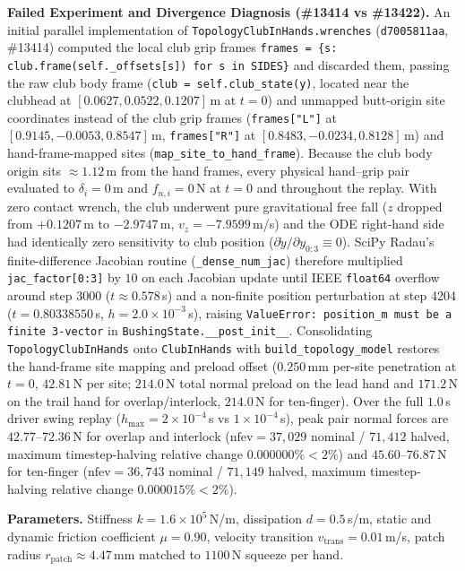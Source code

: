 \documentclass[11pt,a4paper]{article}
\begin{document}
\textbf{Failed Experiment and Divergence Diagnosis (\#13414 vs \#13422).} An initial parallel implementation of
\texttt{TopologyClubInHands.wrenches} (\texttt{d7005811aa}, \#13414) computed the local club grip frames
\texttt{frames = \{s: club.frame(self.\_offsets[s]) for s in SIDES\}} and discarded them, passing the raw club body frame
(\texttt{club = self.club\_state(y)}, located near the clubhead at $[0.0627, 0.0522, 0.1207]$\,m at $t=0$) and unmapped butt-origin site
coordinates instead of the club grip frames (\texttt{frames["L"]} at $[0.9145, -0.0053, 0.8547]$\,m, \texttt{frames["R"]} at
$[0.8483, -0.0234, 0.8128]$\,m) and hand-frame-mapped sites (\texttt{map\_site\_to\_hand\_frame}). Because the club body origin sits
$\approx 1.12$\,m from the hand frames, every physical hand--grip pair evaluated to $\delta_i = 0$\,m and $f_{n,i} = 0$\,N at $t=0$ and
throughout the replay. With zero contact wrench, the club underwent pure gravitational free fall ($z$ dropped from $+0.1207$\,m to
$-2.9747$\,m, $v_z = -7.9599$\,m/s) and the ODE right-hand side had identically zero sensitivity to club position
($\partial \dot{y} / \partial y_{0:3} \equiv 0$). SciPy Radau's finite-difference Jacobian routine (\texttt{\_dense\_num\_jac}) therefore
multiplied \texttt{jac\_factor[0:3]} by $10$ on each Jacobian update until IEEE \texttt{float64} overflow around step 3000 ($t \approx 0.578$\,s)
and a non-finite position perturbation at step 4204 ($t = 0.80338550$\,s, $h = 2.0 \times 10^{-3}$\,s), raising
\texttt{ValueError: position\_m must be a finite 3-vector} in \texttt{BushingState.\_\_post\_init\_\_}. Consolidating
\texttt{TopologyClubInHands} onto \texttt{ClubInHands} with \texttt{build\_topology\_model} restores the hand-frame site mapping and preload
offset ($0.250$\,mm per-site penetration at $t=0$, $42.81$\,N per site; $214.0$\,N total normal preload on the lead hand and $171.2$\,N on the
trail hand for overlap/interlock, $214.0$\,N for ten-finger). Over the full $1.0$\,s driver swing replay ($h_{\max} = 2 \times 10^{-4}$\,s vs
$1 \times 10^{-4}$\,s), peak pair normal forces are $42.77$--$72.36$\,N for overlap and interlock ($\mathrm{nfev} = 37{,}029$ nominal /
$71{,}412$ halved, maximum timestep-halving relative change $0.000000\% < 2\%$) and $45.60$--$76.87$\,N for ten-finger
($\mathrm{nfev} = 36{,}743$ nominal / $71{,}149$ halved, maximum timestep-halving relative change $0.000015\% < 2\%$).

\textbf{Parameters.} Stiffness $k = 1.6 \times 10^5$\,N/m, dissipation $d = 0.5$\,s/m, static and dynamic friction coefficient $\mu = 0.90$,
velocity transition $v_{\mathrm{trans}} = 0.01$\,m/s, patch radius $r_{\mathrm{patch}} \approx 4.47$\,mm matched to $1100$\,N squeeze per hand.
\end{document}
